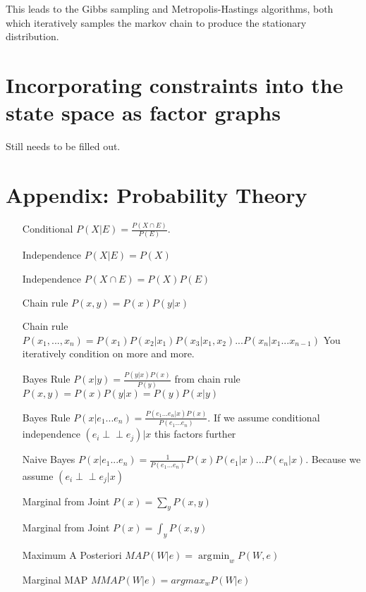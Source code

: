 \documentclass[]{article}
\def\ci{\perp\!\!\!\perp}
\DeclareMathOperator*{\argmin}{\arg\!\min}
\begin{document}
This leads to the Gibbs sampling and Metropolis-Hastings algorithms, both which iteratively samples the markov chain to produce the stationary distribution.



\section{Incorporating constraints into the state space as factor graphs}

Still needs to be filled out.

\pagebreak
\section{Appendix: Probability Theory}

\begin{itemize}


\item [Conditional] $P(X|E) = \frac{P(X \cap E)}{P(E)}$.  

\item [Independence] $P(X|E) = P(X)$

\item [Independence] $P(X \cap E) = P(X)P(E)$


\item [Chain rule] $P(x,y) = P(x)P(y|x)$

\item [Chain rule] $P(x_1,...,x_n) = P(x_1)P(x_2|x_1)P(x_3|x_1,x_2) ... P(x_n|x_1 ... x_{n-1})$ You iteratively condition on more and more.

\item [Bayes Rule] $P(x|y) = \frac{P(y|x)P(x)}{P(y)}$ from chain rule $P(x,y) = P(x)P(y|x) = P(y)P(x|y)$

\item [Bayes Rule] $P(x|e_1...e_n) = \frac{P(e_1...e_n|x)P(x)}{P(e_1...e_n)}$. If we assume conditional independence $(e_i \ci e_j) | x$ this factors further 

\item [Naive Bayes] $P(x|e_1...e_n) = \frac{1}{P(e_1...e_n)}P(x)P(e_1|x)...P(e_n|x)$. Because we assume $(e_i \ci e_j | x)$

\item [Marginal from Joint] $P(x) = \sum_{y}P(x,y)$ 

\item [Marginal from Joint] $P(x) = \int_{y}P(x,y)$

\item [Maximum A Posteriori] $MAP(W|e) = \argmin_{w}P(W,e)$

\item [Marginal MAP] $MMAP(W|e) = argmax_{w}P(W|e)$


\end{itemize}
\end{document}
